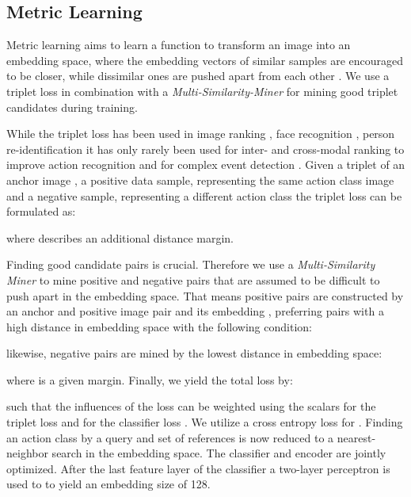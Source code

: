 \documentclass[10pt,conference,a4paper]{IEEEtran}
\begin{document}
\subsection{Metric Learning}
\label{ssec:metric_learning}

Metric learning aims to learn a function to transform an image into an embedding space, where the embedding vectors of similar samples are encouraged to be closer, while dissimilar ones are pushed apart from each other \cite{wang2019multi}. We use a triplet loss in combination with a \textit{Multi-Similarity-Miner} \cite{wang2019multi} for mining good triplet candidates during training. 





While the triplet loss has been used in image ranking \cite{bui2017compact}, face recognition \cite{schroff2015facenet}, person re-identification \cite{hermans2017defense} it has only 
rarely been used for inter- and cross-modal ranking to improve action recognition \cite{wang2018cooperative} and for complex event detection \cite{hou2017content}.
Given a triplet of an anchor image , a positive data sample, representing the same action class image  and a negative sample, representing a different action class  the triplet loss can be formulated as:


where  describes an additional distance margin.

Finding good candidate pairs is crucial. Therefore we use a \textit{Multi-Similarity Miner} \cite{wang2019multi, Musgrave2019} to mine positive and negative pairs that are assumed to be difficult to push apart in the embedding space.
That means positive pairs are constructed by an anchor and positive image pair  and its embedding , preferring pairs with a high distance in embedding space with the following condition:

likewise, negative pairs  are mined by the lowest distance in embedding space:

where  is a given margin.
Finally, we yield the total loss by:


such that the influences of the loss can be weighted using the scalars  for the triplet loss  and  for the classifier loss . We utilize a cross entropy loss for . Finding an action class by a query and set of references is now reduced to a nearest-neighbor search in the embedding space. 
The classifier and encoder are jointly optimized. After the last feature layer of the classifier a two-layer perceptron is used to to yield an embedding size of 128.
\end{document}
